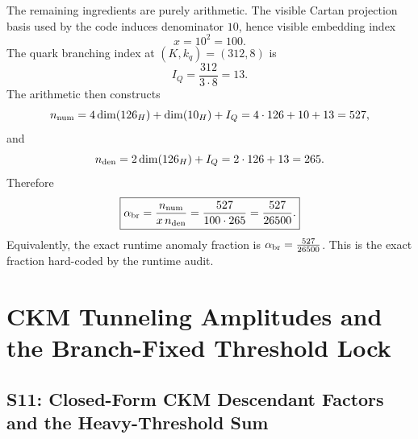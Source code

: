 \documentclass[11pt]{article}
\begin{document}
The remaining ingredients are purely arithmetic. The visible Cartan projection basis used by the code induces denominator $10$, hence visible embedding index
\begin{equation}
 x = 10^2 = 100.
\end{equation}
The quark branching index at $(K,k_q)=(312,8)$ is
\begin{equation}
 I_Q = \frac{312}{3\cdot 8}=13.
\end{equation}
The arithmetic then constructs
\begin{equation}
 n_{\rm num}=4\dim(126_H)+\dim(10_H)+I_Q = 4\cdot126+10+13 = 527,
\end{equation}
and
\begin{equation}
 n_{\rm den}=2\dim(126_H)+I_Q = 2\cdot126+13 = 265.
\end{equation}
Therefore
\begin{equation}
\boxed{
\alpha_{\rm br}
 =
 \frac{n_{\rm num}}{x\,n_{\rm den}}
 =
 \frac{527}{100\cdot265}
 =
 \frac{527}{26500}.}
\end{equation}
Equivalently, the exact runtime anomaly fraction is $\alpha_{\rm br}=\frac{527}{26500}$.
This is the exact fraction hard-coded by the runtime audit.

\section{CKM Tunneling Amplitudes and the Branch-Fixed Threshold Lock}

\subsection*{S11: Closed-Form CKM Descendant Factors and the Heavy-Threshold Sum}
\end{document}
